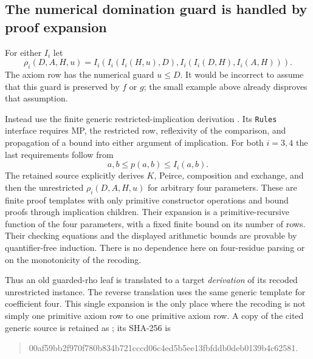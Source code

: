 \subsection{The numerical domination guard is handled by proof expansion}

For either $I_i$ let
\[
 \rho_i(D,A,H,u)=
 I_i(I_i(I_i(H,u),D),I_i(I_i(D,H),I_i(A,H))).
\]
The axiom row has the numerical guard $u\le D$.  It would be incorrect
to assume that this guard is preserved by $f$ or $g$; the small example
above already disproves that assumption.

Instead use the finite generic restricted-implication derivation
.
Its \texttt{Rules} interface requires MP, the restricted row, reflexivity
of the comparison, and propagation of a bound into either argument of
implication.  For both $i=3,4$ the last requirements follow from
\[
 a,b\le p(a,b)\le I_i(a,b).
\]
The retained source explicitly derives $K$, Peirce, composition and
exchange, and then the unrestricted $\rho_i(D,A,H,u)$ for arbitrary four
parameters.  These are finite proof templates with only primitive
constructor operations and bound proofs through implication children.
Their expansion is a primitive-recursive function of the four parameters,
with a fixed finite bound on its number of rows.  Their checking equations
and the displayed arithmetic bounds are provable by quantifier-free
induction.  There is no dependence here on four-residue parsing or on the
monotonicity of the recoding.

Thus an old guarded-rho leaf is translated to a target \emph{derivation}
of its recoded unrestricted instance.  The reverse translation uses the
same generic template for coefficient four.  This single expansion is the
only place where the recoding is not simply one primitive axiom row to one
primitive axiom row.  A copy of the cited generic source is retained as
\texttt{}; its SHA-256 is
\begin{quote}\small\ttfamily
00af59bb2f970f780b834b721cccd06c4ed5b5ee13fbfddb0deb0139b4c62581.
\end{quote}

